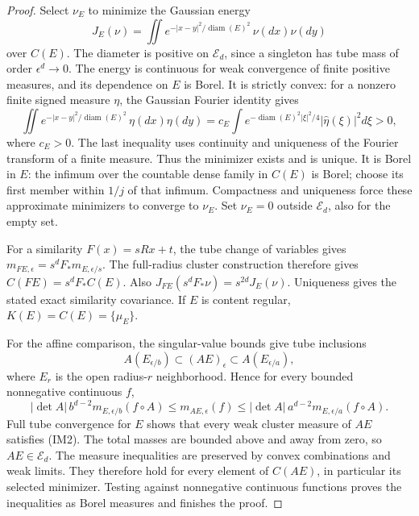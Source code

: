 \documentclass[11pt]{article}
\theoremstyle{definition}\newtheorem{definition}[theorem]{Definition}
\theoremstyle{remark}\newtheorem{remark}[theorem]{Remark}
\begin{document}
\begin{proof}
Select $\nu_E$ to minimize the Gaussian energy
\[
 J_E(\nu)=\iint e^{-|x-y|^2/\operatorname{diam}(E)^2}\,\nu(dx)\nu(dy)
 \tag{IM4}
\]
over $C(E)$. The diameter is positive on $\mathcal E_d$, since a singleton
has tube mass of order $\epsilon^d\to0$. The energy is continuous for weak convergence of finite
positive measures, and its dependence on $E$ is Borel. It is strictly convex: for a nonzero finite signed
measure $\eta$, the Gaussian Fourier identity gives
\[
 \iint e^{-|x-y|^2/\operatorname{diam}(E)^2}\,\eta(dx)\eta(dy)
   =c_E\int e^{-\operatorname{diam}(E)^2|\xi|^2/4}
                  |\widehat\eta(\xi)|^2d\xi>0,
\]
where $c_E>0$. The last inequality
uses continuity and uniqueness of the Fourier transform of a finite
measure. Thus the minimizer exists and is unique. It is Borel in $E$:
the infimum over the countable dense family in $C(E)$ is Borel;
choose its first member within $1/j$ of that infimum. Compactness and
uniqueness force these approximate minimizers to converge to $\nu_E$.
Set $\nu_E=0$ outside $\mathcal E_d$, also for the empty set.

For a similarity $F(x)=sRx+t$, the tube change of variables gives
$m_{FE,\epsilon}=s^d F_*m_{E,\epsilon/s}$. The full-radius cluster
construction therefore gives $C(FE)=s^d F_*C(E)$. Also
$J_{FE}(s^dF_*\nu)=s^{2d}J_E(\nu)$. Uniqueness gives the stated
exact similarity covariance.
If $E$ is content regular, $K(E)=C(E)=\{\mu_E\}$.

For the affine comparison, the singular-value bounds give tube inclusions
\[
 A(E_{\epsilon/b})\subset(AE)_\epsilon
                         \subset A(E_{\epsilon/a}),
\]
where $E_r$ is the open radius-$r$ neighborhood. Hence for every bounded
nonnegative continuous $f$,
\[
 |\det A|\,b^{d-2}
 m_{E,\epsilon/b}(f\circ A)
 \le m_{AE,\epsilon}(f)
 \le |\det A|\,a^{d-2}
 m_{E,\epsilon/a}(f\circ A).
 \tag{IM5}
\]
Full tube convergence for $E$ shows that every weak cluster
measure of $AE$ satisfies (IM2). The total masses are bounded above
and away from zero, so $AE\in\mathcal E_d$. The measure inequalities
are preserved by convex combinations and weak limits. They therefore
hold for every element of $C(AE)$, in particular its selected minimizer.
Testing against nonnegative continuous functions proves the inequalities
as Borel measures and finishes the proof.
\end{proof}
\end{document}
